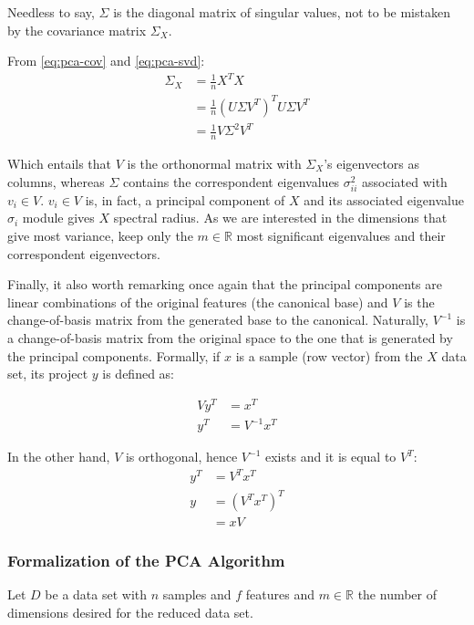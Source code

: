 \documentclass[12pt]{article}
\begin{document}
Needless to say, $\Sigma$ is the diagonal matrix of singular values, not to be mistaken by the covariance matrix $\Sigma_X$.

From \ref{eq:pca-cov} and \ref{eq:pca-svd}:
\begin{align*}
	\Sigma_X &= \frac{1}{n} X^TX \\
	&= \frac{1}{n} (U\Sigma V^T)^TU\Sigma V^T \\
	&= \frac{1}{n} V\Sigma^2 V^T
\end{align*}

Which entails that $V$ is the orthonormal matrix with $\Sigma_X$'s eigenvectors as columns, whereas $\Sigma$ contains the correspondent eigenvalues $\sigma_{ii}^2$ associated with $v_i\in V$. $v_i\in V$ is, in fact, a principal component of $X$ and its associated eigenvalue $\sigma_i$ module gives $X$ spectral radius. As we are interested in the dimensions that give most variance, keep only the $m\in\mathbb{R}$ most significant eigenvalues and their correspondent eigenvectors.

Finally, it also worth remarking once again that the principal components are linear combinations of the original features (the canonical base) and $V$ is the change-of-basis matrix from the generated base to the canonical. Naturally, $V^{-1}$ is a change-of-basis matrix from the original space to the one that is generated by the principal components. Formally, if $x$ is a sample (row vector) from the $X$ data set, its project $y$ is defined as:

\begin{align*}
	Vy^T &= x^T \\
	y^T  &= V^{-1}x^T
\end{align*}

In the other hand, $V$ is orthogonal, hence $V^{-1}$ exists and it is equal to $V^T$: \begin{align*}
	y^T &= V^Tx^T \\
	y &= (V^Tx^T)^T \\
      &= xV
\end{align*}

\subsubsection{Formalization of the PCA Algorithm}

Let $D$ be a data set with $n$ samples and $f$ features and $m\in\mathbb{R}$ the number of dimensions desired for the reduced data set. \cite{pca2002} \cite{pcapy}
\end{document}
